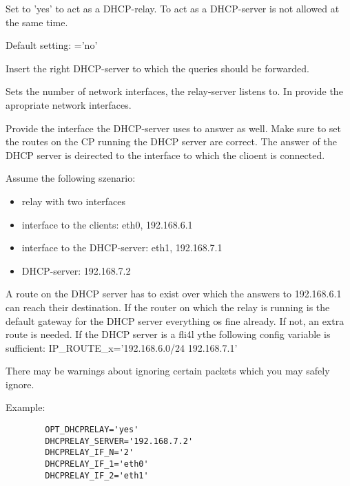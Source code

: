 \begin{description}


Set to 'yes' to act as a DHCP-relay. To act as a DHCP-server
is not allowed at the same time.

Default setting: ='no'

Insert the right DHCP-server to which the queries should be forwarded.

Sets  the number of network interfaces,
the relay-server listens to. In  provide the apropriate
network interfaces.

Provide the interface the DHCP-server uses to answer as well. Make
sure to set the routes on the CP running the DHCP server are correct.
The answer of the DHCP server is deirected to the interface to which
the clioent is connected.

Assume the following szenario:

\begin{itemize}
\item relay with two interfaces
\item interface to the clients: eth0, 192.168.6.1
\item interface to the DHCP-server:  eth1, 192.168.7.1
\item DHCP-server:  192.168.7.2
\end{itemize}

A route on the DHCP server has to exist over which the answers to
192.168.6.1 can reach their destination. If the router on which the
relay is running is the default gateway for the DHCP server everything
os fine already. If not, an extra route is needed. If the DHCP server
is a fli4l ythe following config variable is sufficient:
IP\_ROUTE\_x='192.168.6.0/24 192.168.7.1'

There may be warnings about ignoring certain packets which you may safely ignore.

Example:

\begin{example}
\begin{verbatim}
        OPT_DHCPRELAY='yes'
        DHCPRELAY_SERVER='192.168.7.2'
        DHCPRELAY_IF_N='2'
        DHCPRELAY_IF_1='eth0'
        DHCPRELAY_IF_2='eth1'
\end{verbatim}
\end{example}

\end{description}

